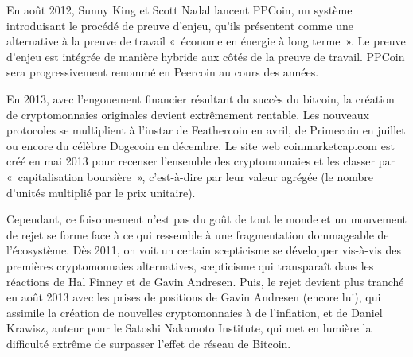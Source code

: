 En août 2012, Sunny King et Scott Nadal lancent PPCoin, un système introduisant le procédé de preuve d'enjeu, qu'ils présentent comme une alternative à la preuve de travail «~économe en énergie à long terme~». Le preuve d'enjeu est intégrée de manière hybride aux côtés de la preuve de travail. PPCoin sera progressivement renommé en Peercoin au cours des années.


En 2013, avec l'engouement financier résultant du succès du bitcoin, la création de cryptomonnaies originales devient extrêmement rentable. Les nouveaux protocoles se multiplient à l'instar de Feathercoin en avril, de Primecoin en juillet ou encore du célèbre Dogecoin en décembre. Le site web coinmarketcap.com est créé en mai 2013 pour recenser l'ensemble des cryptomonnaies et les classer par «~capitalisation boursière~», c'est-à-dire par leur valeur agrégée (le nombre d'unités multiplié par le prix unitaire).

Cependant, ce foisonnement n'est pas du goût de tout le monde et un mouvement de rejet se forme face à ce qui ressemble à une fragmentation dommageable de l'écosystème. Dès 2011, on voit un certain scepticisme se développer vis-à-vis des premières cryptomonnaies alternatives, scepticisme qui transparaît dans les réactions de Hal Finney et de Gavin Andresen. Puis, le rejet devient plus tranché en août 2013 avec les prises de positions de Gavin Andresen (encore lui), qui assimile la création de nouvelles cryptomonnaies à de l'inflation, et de Daniel Krawisz, auteur pour le Satoshi Nakamoto Institute, qui met en lumière la difficulté extrême de surpasser l'effet de réseau de Bitcoin.

